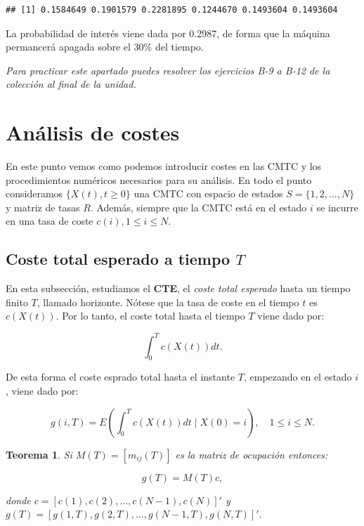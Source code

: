 \documentclass[
]{book}
\newtheorem{theorem}{Teorema}[chapter]
\theoremstyle{definition}
\theoremstyle{definition}
\theoremstyle{definition}
\theoremstyle{definition}
\theoremstyle{remark}
\begin{document}
\begin{verbatim}
## [1] 0.1584649 0.1901579 0.2281895 0.1244670 0.1493604 0.1493604
\end{verbatim}

La probabilidad de interés viene dada por 0.2987, de forma que la máquina permancerá apagada sobre el 30\% del tiempo.

\emph{Para practicar este apartado puedes resolver los ejercicios B-9 a B-12 de la colección al final de la unidad.}

\hypertarget{CMTCI}{%
\section{Análisis de costes}\label{CMTCI}}

En este punto vemos como podemos introducir costes en las CMTC y los procedimientos numéricos necesarios para su análisis. En todo el punto consideramos \(\{X(t), t \geq 0\}\) una CMTC con espacio de estados \(S = \{1, 2,...,N\}\) y matriz de tasas \(R\). Además, siempre que la CMTC está en el estado \(i\) se incurre en una tasa de coste \(c(i), 1 \leq i \leq N\).

\hypertarget{coste-total-esperado-a-tiempo-t}{%
\subsection{\texorpdfstring{Coste total esperado a tiempo \(T\)}{Coste total esperado a tiempo T}}\label{coste-total-esperado-a-tiempo-t}}

En esta subsección, estudiamos el \textbf{CTE}, el \emph{coste total esperado} hasta un tiempo finito \(T\), llamado horizonte. Nótese que la tasa de coste en el tiempo \(t\) es \(c(X(t))\). Por lo tanto, el coste total hasta el tiempo \(T\) viene dado por:

\[\int_0^T c(X(t))dt.\]

De esta forma el coste esprado total hasta el instante \(T\), empezando en el estado \(i\), viene dado por:

\[g(i, T) = E\left( \int_0^T c(X(t))dt \mid X(0) = i \right), \quad 1 \leq i \leq N.\]

\begin{theorem}
Si \(M(T) = [m_{ij}(T)]\) es la matriz de ocupación entonces:

\[g(T) = M(T)c,\]

donde \(c = [c(1), c(2),...,c(N-1), c(N)]'\) y \(g(T) = [g(1, T), g(2,T),..., g(N-1, T), g(N, T)]'.\)
\end{theorem}
\end{document}
